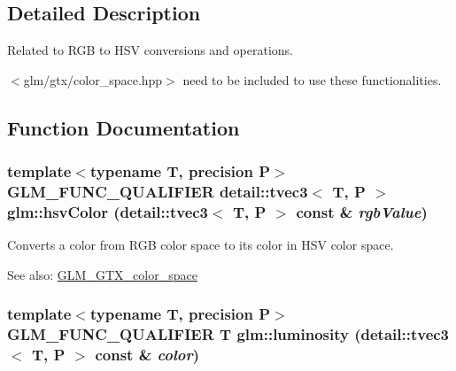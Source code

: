 \subsection{Detailed Description}
Related to RGB to HSV conversions and operations. 

$<$glm/gtx/color\_\-space.hpp$>$ need to be included to use these functionalities. 

\subsection{Function Documentation}
\hypertarget{group__gtx__color__space_g2532e85174ba333c4f60127d03d71655}{
\subsubsection[hsvColor]{\setlength{\rightskip}{0pt plus 5cm}template$<$typename T, precision P$>$ GLM\_\-FUNC\_\-QUALIFIER detail::tvec3$<$ T, P $>$ glm::hsvColor (detail::tvec3$<$ T, P $>$ const \& {\em rgbValue})}}
\label{group__gtx__color__space_g2532e85174ba333c4f60127d03d71655}


Converts a color from RGB color space to its color in HSV color space. \begin{Desc}
\item[See also:]\hyperlink{group__gtx__color__space}{GLM\_\-GTX\_\-color\_\-space} \end{Desc}
\hypertarget{group__gtx__color__space_gdd1c8feae48a4fcf9e575648b25b914f}{
\subsubsection[luminosity]{\setlength{\rightskip}{0pt plus 5cm}template$<$typename T, precision P$>$ GLM\_\-FUNC\_\-QUALIFIER T glm::luminosity (detail::tvec3$<$ T, P $>$ const \& {\em color})}}
\label{group__gtx__color__space_gdd1c8feae48a4fcf9e575648b25b914f}


